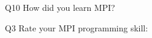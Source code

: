 \begin{description}%
\item{Q10} How did you learn MPI?%
\item{Q3} Rate your MPI programming skill:%
\end{description}%
